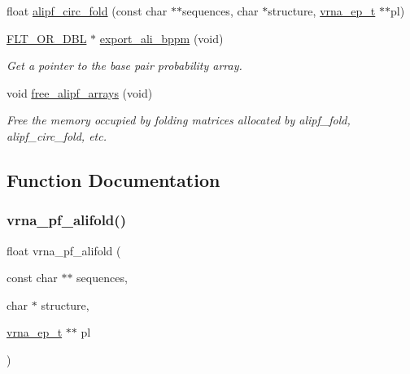 \begin{DoxyCompactItemize}
float \hyperlink{group__consensus__pf__fold_ga604a42ad64178279551ad3e4def3d603}{alipf\+\_\+circ\+\_\+fold} (const char $\ast$$\ast$sequences, char $\ast$structure, \hyperlink{group__struct__utils_gab9ac98ab55ded9fb90043b024b915aca}{vrna\+\_\+ep\+\_\+t} $\ast$$\ast$pl)
\item 
\hyperlink{group__data__structures_ga31125aeace516926bf7f251f759b6126}{F\+L\+T\+\_\+\+O\+R\+\_\+\+D\+BL} $\ast$ \hyperlink{group__consensus__pf__fold_ga11b6ab8bd9be1821fea352b190a01cab}{export\+\_\+ali\+\_\+bppm} (void)
\begin{DoxyCompactList}\small\item\em Get a pointer to the base pair probability array. \end{DoxyCompactList}\item 
void \hyperlink{group__consensus__pf__fold_ga0c0498f35686e26b38ee460d3db1a661}{free\+\_\+alipf\+\_\+arrays} (void)
\begin{DoxyCompactList}\small\item\em Free the memory occupied by folding matrices allocated by alipf\+\_\+fold, alipf\+\_\+circ\+\_\+fold, etc. \end{DoxyCompactList}\end{DoxyCompactItemize}


\subsection{Function Documentation}
\mbox{\label{group__consensus__pf__fold_ga374e31a0f326b2c5da5b84e143a63f38}} 
\subsubsection{\texorpdfstring{vrna\+\_\+pf\+\_\+alifold()}{vrna\_pf\_alifold()}}
{\footnotesize\ttfamily float vrna\+\_\+pf\+\_\+alifold (\begin{DoxyParamCaption}\item[{const char $\ast$$\ast$}]{sequences,  }\item[{char $\ast$}]{structure,  }\item[{\hyperlink{group__struct__utils_gab9ac98ab55ded9fb90043b024b915aca}{vrna\+\_\+ep\+\_\+t} $\ast$$\ast$}]{pl }\end{DoxyParamCaption})}



